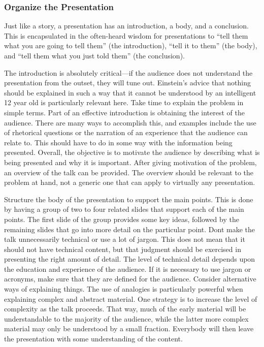 \subsubsection*{Organize the
Presentation}\label{organize-the-presentation}

Just like a story, a presentation has an introduction, a body, and a
conclusion. This is encapsulated in the often-heard wisdom for
presentations to ``tell them what you are going to tell them'' (the
introduction), ``tell it to them'' (the body), and ``tell them what you
just told them'' (the conclusion).

The introduction is absolutely critical---if the audience does not
understand the presentation from the outset, they will tune out.
Einstein's advice that nothing should be explained in such a way that it
cannot be understood by an intelligent 12 year old is particularly
relevant here. Take time to explain the problem in simple terms. Part of
an effective introduction is obtaining the interest of the audience.
There are many ways to accomplish this, and examples include the use of
rhetorical questions or the narration of an experience that the audience
can relate to. This should have to do in some way with the information
being presented. Overall, the objective is to motivate the audience by
describing what is being presented and why it is important. After giving
motivation of the problem, an overview of the talk can be provided. The
overview should be relevant to the problem at hand, not a generic one
that can apply to virtually any presentation.

Structure the body of the presentation to support the main points. This
is done by having a group of two to four related slides that support
each of the main points. The first slide of the group provides some key
ideas, followed by the remaining slides that go into more detail on the
particular point. Don\textquotesingle t make the talk unnecessarily
technical or use a lot of jargon. This does not mean that it should not
have technical content, but that judgment should be exercised in
presenting the right amount of detail. The level of technical detail
depends upon the education and experience of the audience. If it is
necessary to use jargon or acronyms, make sure that they are defined for
the audience. Consider alternative ways of explaining things. The use of
analogies is particularly powerful when explaining complex and abstract
material. One strategy is to increase the level of complexity as the
talk proceeds. That way, much of the early material will be
understandable to the majority of the audience, while the latter more
complex material may only be understood by a small fraction. Everybody
will then leave the presentation with some understanding of the content.

